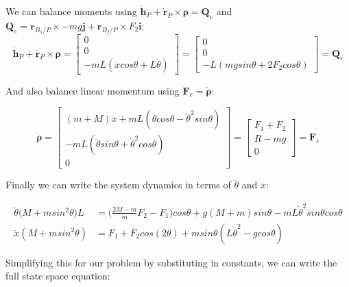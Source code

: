\documentclass[main.tex]{subfiles}
\begin{document}
We can balance moments using $\boldsymbol{\dot{h}}_P + \boldsymbol{\dot{r}}_P \times \boldsymbol{\rho} = \boldsymbol{Q}_{e}$ and $ \boldsymbol{Q}_{e} = \boldsymbol{r}_{B_1/P} \times -mg\boldsymbol{j} + \boldsymbol{r}_{B_2/P} \times F_2 \boldsymbol{i}$:
\begin{equation*}
\boldsymbol{\dot{h}}_P + \boldsymbol{\dot{r}}_P \times \boldsymbol{\rho} = 
\begin{bmatrix} 0 \\ 0 \\ -mL(\ddot{x} cos\theta + L\ddot{\theta}) \end{bmatrix} = \begin{bmatrix} 0 \\ 0 \\ -L(mgsin\theta + 2 F_2 cos \theta) \end{bmatrix} = \boldsymbol{Q}_e
\end{equation*}

And also balance linear momentum using $\boldsymbol{F}_e = \dot{\boldsymbol{\rho}}$:

\begin{equation*}
    \dot{\boldsymbol{\rho}} = \begin{bmatrix} (m+M)\ddot{x} + mL(\ddot{\theta}cos\theta - \dot{\theta}^2 sin\theta) \\ -mL(\ddot{\theta}sin\theta + \dot{\theta}^2 cos\theta) \\ 0 \end{bmatrix}
    = \begin{bmatrix} F_1 + F_2 \\ R-mg \\ 0 \end{bmatrix} = \boldsymbol{F}_e
\end{equation*}

Finally we can write the system dynamics in terms of $\ddot{\theta}$ and $\ddot{x}$:

\begin{align}
\ddot{\theta}\big(M+msin^2\theta \big)L & = \bigg(\frac{2M-m}{m}F_2-F_1\bigg)cos\theta + g(M+m)sin\theta - mL\dot{\theta}^2 sin\theta cos\theta\\
\ddot{x}(M+msin^2\theta) & = F_1 + F_2cos(2\theta)+ msin\theta(L\dot{\theta}^2-gcos\theta)
\end{align}


Simplifying this for our problem by substituting in constants, we can write the full state space equation:
\end{document}
